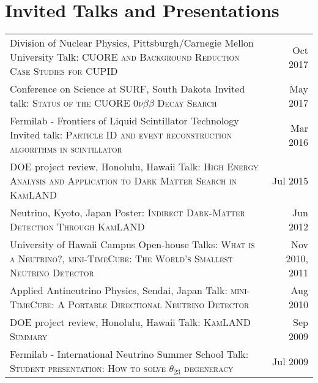 \documentclass[10pt]{article} %
\begin{document}
%
%


\clearpage
\section{Invited Talks and Presentations}

\noindent\begin{tabularx}{\linewidth}{@{{}\textbullet\enskip}X@{\quad}r@{}}
	Division of Nuclear Physics, Pittsburgh/Carnegie Mellon University \newline Talk: \textsc{CUORE and Background Reduction Case Studies for CUPID} & Oct 2017 \\
	Conference on Science at SURF, South Dakota \newline Invited talk: \textsc{Status of the CUORE $0\nu\beta\beta$ Decay Search} & May 2017 \\
	Fermilab - Frontiers of Liquid Scintillator Technology \newline Invited talk: \textsc{Particle ID and event reconstruction algorithms in scintillator} & Mar 2016 \\
	DOE project review, Honolulu, Hawaii \newline Talk: \textsc{High Energy Analysis and Application to Dark Matter Search in KamLAND} & Jul 2015 \\
	Neutrino, Kyoto, Japan \newline Poster: \textsc{Indirect Dark-Matter Detection Through KamLAND} & Jun 2012 \\
	University of Hawaii Campus Open-house \newline Talks: \textsc{What is a Neutrino?}, \textsc{mini-TimeCube: The World's Smallest Neutrino Detector} & Nov 2010, 2011 \\
	Applied Antineutrino Physics, Sendai, Japan \newline Talk: \textsc{mini-TimeCube: A Portable Directional Neutrino Detector} & Aug 2010 \\
	DOE project review, Honolulu, Hawaii \newline Talk: \textsc{KamLAND Summary} & Sep 2009 \\
	Fermilab - International Neutrino Summer School \newline Talk: \textsc{Student presentation: How to solve $\theta_{23}$ degeneracy} & Jul 2009 \\
\end{tabularx}
\end{document}
